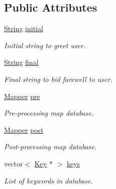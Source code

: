 \subsection*{Public Attributes}
\begin{DoxyCompactItemize}
\item 
\mbox{\label{classScript_a179b6b4f3ac3c7d8f4a4dd59ab7c262c}} 
\mbox{\hyperlink{classString}{String}} \mbox{\hyperlink{classScript_a179b6b4f3ac3c7d8f4a4dd59ab7c262c}{initial}}
\begin{DoxyCompactList}\small\item\em Initial string to greet user. \end{DoxyCompactList}\item 
\mbox{\label{classScript_a3918303573708a77fe61c2ec91865dc9}} 
\mbox{\hyperlink{classString}{String}} \mbox{\hyperlink{classScript_a3918303573708a77fe61c2ec91865dc9}{final}}
\begin{DoxyCompactList}\small\item\em Final string to bid farewell to user. \end{DoxyCompactList}\item 
\mbox{\label{classScript_ab338df3426a5f488be94ec6c15393ba6}} 
\mbox{\hyperlink{classMapper}{Mapper}} \mbox{\hyperlink{classScript_ab338df3426a5f488be94ec6c15393ba6}{pre}}
\begin{DoxyCompactList}\small\item\em Pre-\/processing map database. \end{DoxyCompactList}\item 
\mbox{\label{classScript_ac73831210ecd442bbeafbd9a496bb042}} 
\mbox{\hyperlink{classMapper}{Mapper}} \mbox{\hyperlink{classScript_ac73831210ecd442bbeafbd9a496bb042}{post}}
\begin{DoxyCompactList}\small\item\em Post-\/processing map database. \end{DoxyCompactList}\item 
\mbox{\label{classScript_ad1fcd3868d74927bd60118f0e4eaf574}} 
vector$<$ \mbox{\hyperlink{classKey}{Key}} $\ast$ $>$ \mbox{\hyperlink{classScript_ad1fcd3868d74927bd60118f0e4eaf574}{keys}}
\begin{DoxyCompactList}\small\item\em List of keywords in database. \end{DoxyCompactList}\item 

\end{DoxyCompactItemize}
